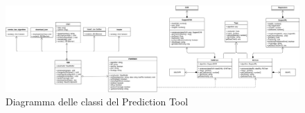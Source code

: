 \begin{figure}[H]
\centering
\includegraphics[scale=0.22]{../../Diagrams/Classes_diagrams/tool_all_classes.png}
\caption{Diagramma delle classi del Prediction Tool}
\end{figure}

